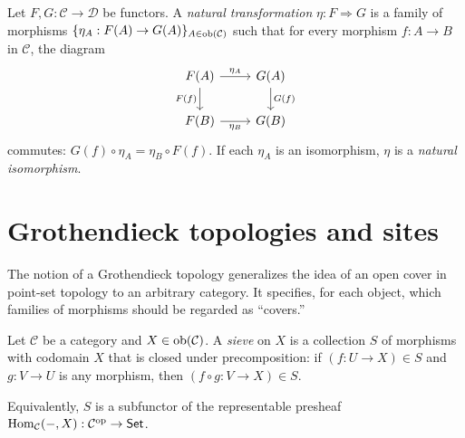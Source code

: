 \begin{definition}
\label{def:nat-trans}
Let $F, G : \mathcal{C} \to \mathcal{D}$ be functors.  A \emph{natural
transformation} $\eta : F \Rightarrow G$ is a family of morphisms
$\{\eta_A : F(A) \to G(A)\}_{A \in \mathrm{ob}(\mathcal{C})}$ such that for
every morphism $f : A \to B$ in $\mathcal{C}$, the diagram
\[
\begin{tikzcd}
F(A) \ar[r, "\eta_A"] \ar[d, "F(f)"'] & G(A) \ar[d, "G(f)"] \\
F(B) \ar[r, "\eta_B"']                 & G(B)
\end{tikzcd}
\]
commutes: $G(f) \circ \eta_A = \eta_B \circ F(f)$.  If each $\eta_A$
is an isomorphism, $\eta$ is a \emph{natural isomorphism}.
\end{definition}



\section{Grothendieck topologies and sites}
\label{sec:sites:grothendieck}

The notion of a Grothendieck topology generalizes the idea of an open
cover in point-set topology to an arbitrary category.  It specifies,
for each object, which families of morphisms should be regarded as
``covers.''

\begin{definition}[Sieve]
\label{def:sieve}
Let $\mathcal{C}$ be a category and $X \in \mathrm{ob}(\mathcal{C})$.  A
\emph{sieve} on $X$ is a collection $S$ of morphisms with codomain
$X$ that is closed under precomposition: if $(f : U \to X) \in S$ and
$g : V \to U$ is any morphism, then $(f \circ g : V \to X) \in S$.

Equivalently, $S$ is a subfunctor of the representable presheaf
$\mathrm{Hom}_{\mathcal{C}}(-, X) : \mathcal{C}^{\mathrm{op}} \to \mathsf{Set}$.
\end{definition}

